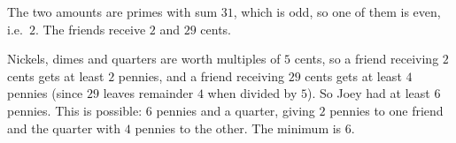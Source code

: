 The two amounts are primes with sum $31$, which is odd, so one of them is even, i.e.\ $2$. The friends receive $2$ and $29$ cents.

Nickels, dimes and quarters are worth multiples of $5$ cents, so a friend receiving $2$ cents gets at least $2$ pennies, and a friend receiving $29$ cents gets at least $4$ pennies (since $29$ leaves remainder $4$ when divided by $5$). So Joey had at least $6$ pennies. This is possible: $6$ pennies and a quarter, giving $2$ pennies to one friend and the quarter with $4$ pennies to the other. The minimum is $\boxed{6}$.

